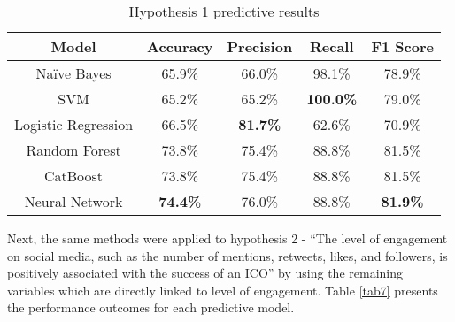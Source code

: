 \documentclass[runningheads]{llncs}
\begin{document}
\begin{table}[htbp]
\caption{Hypothesis 1 predictive results}
\begin{center}
\begin{tabular}{|c|c|c|c|c|}
\hline
\textbf{Model} & \textbf{Accuracy} & \textbf{Precision} & \textbf{Recall} & \textbf{F1 Score} \\
\hline
Naïve Bayes & 65.9\% & 66.0\% & 98.1\% & 78.9\% \\
\hline
SVM & 65.2\% & 65.2\% & \textbf{100.0\%} & 79.0\% \\
\hline
Logistic Regression & 66.5\% & \textbf{81.7\%} & 62.6\% & 70.9\% \\
\hline
Random Forest & 73.8\% & 75.4\% & 88.8\% & 81.5\% \\
\hline
CatBoost & 73.8\% & 75.4\% & 88.8\% & 81.5\% \\
\hline
Neural Network & \textbf{74.4\%} & 76.0\% & 88.8\% & \textbf{81.9\%} \\
\hline
\end{tabular}
\label{tab6}
\end{center}
\end{table}


Next, the same methods were applied to hypothesis 2 - ``The level of engagement on social media, such as the number of mentions, retweets, likes, and followers, is positively associated with the success of an ICO'' by using the remaining variables which are directly linked to level of engagement. Table \ref{tab7} presents the performance outcomes for each predictive model.

\end{document}
